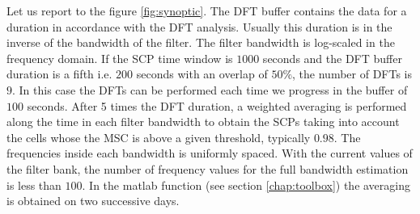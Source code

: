 Let us report to the figure \ref{fig:synoptic}. The DFT buffer contains the data for a duration in accordance with the DFT analysis. Usually this duration is in the inverse of the bandwidth of the filter. The filter bandwidth is log-scaled in the frequency domain. If the SCP time window is $1000$ seconds and the DFT buffer duration is  a fifth i.e. $200$ seconds with an overlap of $50\%$, the number of DFTs  is $9$. In this case the DFTs can be performed each time we progress in the buffer of $100$ seconds. After 5 times the DFT duration, a weighted averaging is performed along the time in each filter bandwidth to obtain the SCPs taking into account the cells whose the MSC is above a given threshold, typically $0.98$. The frequencies inside each bandwidth is uniformly spaced. With the current values of the filter bank, the number of frequency values for the full bandwidth estimation is less than $100$. In the matlab function (see section \ref{chap:toolbox}) the averaging is obtained on two successive days.





